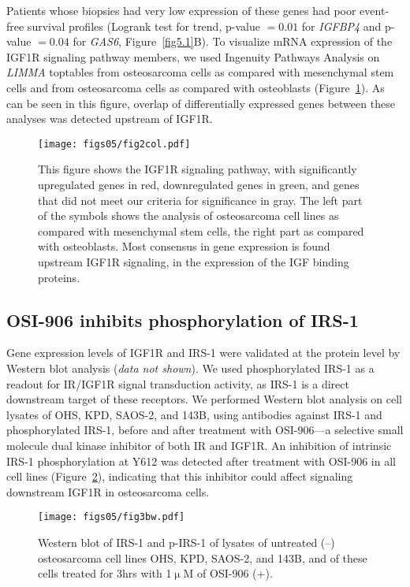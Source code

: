 %
Patients whose biopsies had very low expression of these genes had poor event\hyp{}free survival profiles (Logrank test for trend, p-value $=0.01$ for {\it IGFBP4} and p-value $=0.04$ for {\it GAS6}, Figure~\ref{fig5.1}B). To visualize mRNA expression of the IGF1R signaling pathway members, we used Ingenuity Pathways Analysis on {\it LIMMA} toptables from osteosarcoma cells as compared with mesenchymal stem cells and from osteosarcoma cells as compared with osteoblasts (Figure~\ref{fig5.2}). As can be seen in this figure, overlap of differentially expressed genes between these analyses was detected upstream of IGF1R.
%
\begin{figure}[htbp]
	\centering
	\texttt{[image: figs05/fig2col.pdf]}	%
	\caption{This figure shows the IGF1R signaling pathway, with significantly upregulated genes in red, downregulated genes in green, and genes that did not meet our criteria for significance in gray. The left part of the symbols shows the analysis of osteosarcoma cell lines as compared with mesenchymal stem cells, the right part as compared with osteoblasts. Most consensus in gene expression is found upstream IGF1R signaling, in the expression of the IGF binding proteins.}
	\label{fig5.2}
\end{figure}
%

\subsection{OSI-906 inhibits phosphorylation of IRS-1}
Gene expression levels of IGF1R and IRS-1 were validated at the protein level by Western blot analysis ({\it data not shown}). We used phosphorylated IRS-1 as a readout for IR/IGF1R signal transduction activity, as IRS-1 is a direct downstream target of these receptors. We performed Western blot analysis on cell lysates of OHS, KPD, SAOS-2, and 143B, using antibodies against IRS-1 and phosphorylated IRS-1, before and after treatment with OSI-906---a selective small molecule dual kinase inhibitor of both IR and IGF1R. An inhibition of intrinsic IRS-1 phosphorylation at Y612 was detected after treatment with OSI-906 in all cell lines (Figure~\ref{fig5.3}), indicating that this inhibitor could affect signaling downstream IGF1R in osteosarcoma cells.
%
\begin{figure}[htbp]
  \centering
  \begin{minipage}[b]{0.50\linewidth}
    \texttt{[image: figs05/fig3bw.pdf]}		%
  \end{minipage}
    \hfill
  \begin{minipage}[b]{0.46\linewidth}
     \caption{Western blot of IRS-1 and p-IRS-1 of lysates of untreated (--) osteosarcoma cell lines OHS, KPD, SAOS-2, and 143B, and of these cells treated for 3hrs with 1$\upmu$M of OSI-906 (+).}
     \label{fig5.3}
     \end{minipage}
\end{figure}
%

